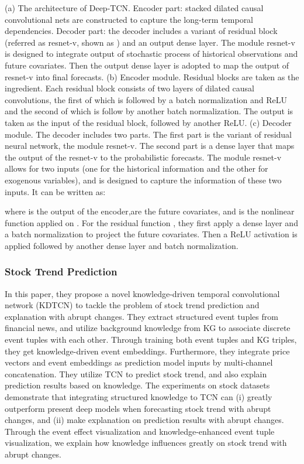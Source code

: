 (a) The architecture of Deep-TCN. Encoder part: stacked dilated causal convolutional nets are constructed to capture the long-term temporal dependencies. Decoder part: the decoder includes a variant of residual block (referred as resnet-v, shown as ) and an output dense layer. The module resnet-v is designed to integrate output of stochastic process of historical observations and future covariates. Then the output dense layer is adopted to map the output of resnet-v into final forecasts. 
(b) Encoder module. Residual blocks are taken as the ingredient. Each residual block consists of two layers of dilated causal convolutions, the first of which is followed by a batch normalization and ReLU and the second of which is follow by another batch normalization. The output is taken as the input of the residual block, followed by another ReLU. 
(c) Decoder module. The decoder includes two parts. The first part is the variant of residual neural network, the module resnet-v. The second part is a dense layer that maps the output of the resnet-v to the probabilistic forecasts. The module resnet-v allows for two inputs (one for the historical information and the other for exogenous variables), and is designed to capture the information of these two inputs. It can be written as:

where  is the output of the encoder,are the future covariates, and is the nonlinear function applied on . For the residual function , they first apply a dense layer and a batch normalization to project the future covariates. Then a ReLU activation is applied followed by another dense layer and batch normalization.

\subsubsection{Stock Trend Prediction}
In this paper, they propose a novel knowledge-driven temporal convolutional network (KDTCN) to tackle the problem of stock trend prediction and explanation with abrupt changes. They extract structured event tuples from financial news, and utilize background knowledge from KG to associate discrete event tuples with each other. Through training both event tuples and KG triples, they get knowledge-driven event embeddings. Furthermore, they integrate price vectors and event embeddings as prediction model inputs by multi-channel concatenation. They utilize TCN to predict stock trend, and also explain prediction results based on knowledge. The experiments on stock datasets demonstrate that integrating structured knowledge to TCN can (i) greatly outperform present deep models when forecasting stock trend with abrupt changes, and (ii) make explanation on prediction results with abrupt changes. Through the event effect visualization and knowledge-enhanced event tuple visualization, we explain how knowledge influences greatly on stock trend with abrupt changes.

